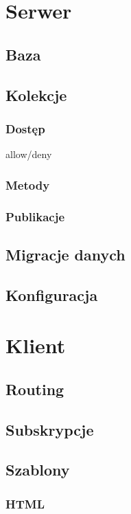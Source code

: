 \section{Serwer}
  \subsection{Baza}
  \subsection{Kolekcje}
  \subsubsection{Dostęp}
   allow/deny
   \subsubsection{Metody}
   \subsubsection{Publikacje}
  \subsection{Migracje danych}
  \subsection{Konfiguracja}



\section{Klient}
  \subsection{Routing}
  \subsection{Subskrypcje}
  \subsection{Szablony}
    \subsubsection{HTML}
